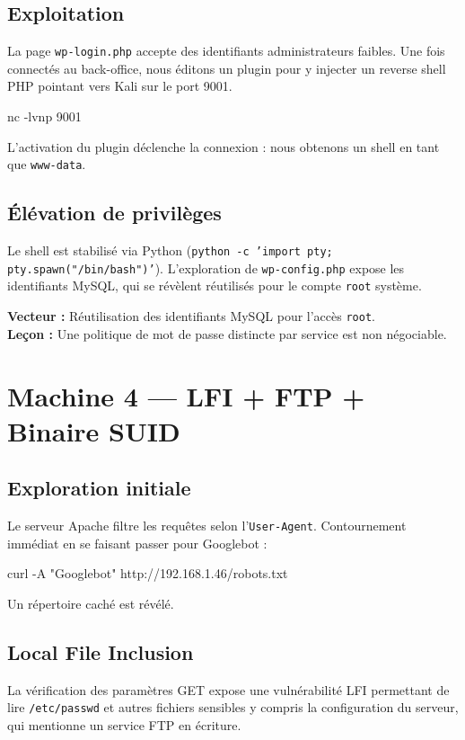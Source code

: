 \documentclass[11pt,a4paper]{article}
\begin{document}
\subsection{Exploitation}
La page \texttt{wp-login.php} accepte des identifiants administrateurs faibles. Une fois connectés au back-office, nous éditons un plugin pour y injecter un reverse shell PHP pointant vers Kali sur le port 9001.

\begin{shellbox}
nc -lvnp 9001
\end{shellbox}

L'activation du plugin déclenche la connexion : nous obtenons un shell en tant que \texttt{www-data}.

\subsection{Élévation de privilèges}
Le shell est stabilisé via Python (\texttt{python -c 'import pty; pty.spawn("/bin/bash")'}). L'exploration de \texttt{wp-config.php} expose les identifiants MySQL, qui se révèlent réutilisés pour le compte \texttt{root} système.

\begin{flagbox}[title={\faFlag~Machine 1 compromise}]
\textbf{Vecteur :} Réutilisation des identifiants MySQL pour l'accès \texttt{root}.\\
\textbf{Leçon :} Une politique de mot de passe distincte par service est non négociable.
\end{flagbox}

\section{Machine 4 — LFI + FTP + Binaire SUID}

\subsection{Exploration initiale}
Le serveur Apache filtre les requêtes selon l'\texttt{User-Agent}. Contournement immédiat en se faisant passer pour Googlebot :
\begin{shellbox}
curl -A "Googlebot" http://192.168.1.46/robots.txt
\end{shellbox}
Un répertoire caché est révélé.

\subsection{Local File Inclusion}
La vérification des paramètres GET expose une vulnérabilité LFI permettant de lire \texttt{/etc/passwd} et autres fichiers sensibles \textemdash{} y compris la configuration du serveur, qui mentionne un service FTP en écriture.
\end{document}

